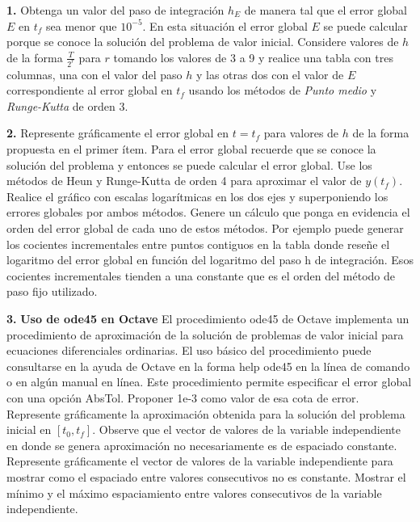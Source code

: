 \documentclass{article}
\begin{document}
\begin{displayquote}
\textbf{1.} Obtenga un valor del paso de integración $h_E$ de manera tal que el error global $E$ en $t_f$ sea menor que $10^{−5}$. En esta situación el error global $E$ se puede calcular porque se conoce la solución del problema de valor inicial. Considere valores de $h$ de la forma $\frac{T}{2^r}$ para $r$ tomando los valores de 3 a 9 y realice una tabla con tres columnas, una con el valor del paso $h$ y las otras dos con el valor de $E$ correspondiente al error global en $t_f$ usando los métodos de \textit{Punto medio} y \textit{Runge-Kutta} de orden 3.

\bigbreak

\textbf{2.} Represente gráficamente el error global en $t = t_f$ para valores de $h$ de la forma propuesta en el primer ítem. Para el error global recuerde que se conoce la solución del problema y entonces se puede calcular el error global. Use los métodos de Heun y Runge-Kutta de orden 4 para aproximar el valor de $y \left( t_f \right)$. Realice el gráfico con escalas  logarítmicas en los dos ejes y superponiendo los errores globales por ambos métodos. Genere un cálculo que ponga en evidencia el orden del error global de cada uno de estos métodos. Por ejemplo puede generar los cocientes incrementales entre puntos contiguos en la tabla donde reseñe el logaritmo del error global en función del logaritmo del paso h de integración. Esos cocientes incrementales tienden a una constante que es el orden del método de paso fijo utilizado.

\bigbreak

\textbf{3.} \textbf{Uso de ode45 en Octave} El procedimiento ode45 de Octave implementa un procedimiento de aproximación de la solución de problemas de valor inicial para ecuaciones diferenciales ordinarias. El uso básico del procedimiento puede consultarse en la ayuda de Octave en la forma help ode45 en la línea de comando o en algún manual en línea. Este procedimiento permite especificar el error global con una opción AbsTol. Proponer 1e-3 como valor de esa cota de error. Represente gráficamente la aproximación obtenida para la solución del problema inicial en $[t_0, t_f ]$. Observe que el vector de valores de la variable independiente en donde se genera aproximación no necesariamente es de espaciado constante. Represente gráficamente el vector de valores de la variable independiente para mostrar como el espaciado entre valores consecutivos no es constante. Mostrar el mínimo y el máximo espaciamiento entre valores consecutivos de la variable independiente.
\end{displayquote}
\end{document}
